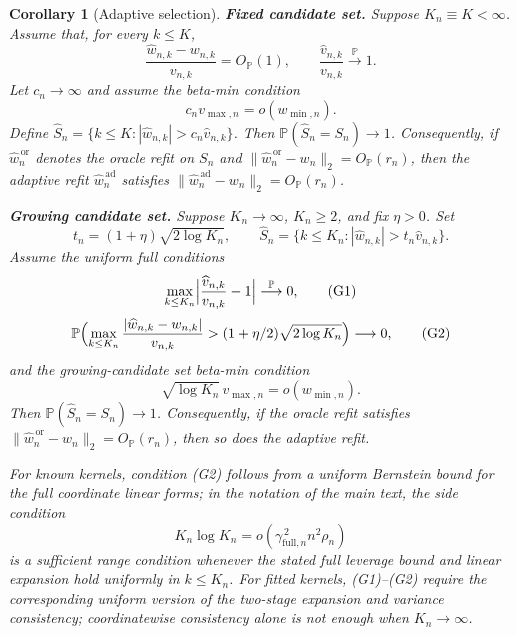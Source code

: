 \documentclass[12pt]{article}
\newtheorem{corollary}{Corollary}
\newcommand{\1}{\mathbf{1}}
\begin{document}
\begin{corollary}[Adaptive selection]
\smallskip
\noindent\textbf{Fixed candidate set.}
Suppose $K_n\equiv K<\infty$. Assume that, for every $k\le K$,
\[
        \frac{\widehat w_{n,k}-w_{n,k}}{v_{n,k}}=O_{\mathbb P}(1),
        \qquad
        \frac{\widehat v_{n,k}}{v_{n,k}}\stackrel{\mathbb P}{\longrightarrow}1 .
\]
Let $c_n\to\infty$ and assume the beta-min condition
\[
        c_n v_{\max,n}=o(w_{\min,n}).
        \tag{F}
\]
Define $\widehat S_n=\{k\le K: |\widehat w_{n,k}|>c_n\widehat v_{n,k}\}$. Then
$\mathbb P(\widehat S_n=S_n)\to 1$. Consequently, if $\widehat w_n^{\,\mathrm{or}}$ denotes the oracle
refit on $S_n$ and $\|\widehat w_n^{\,\mathrm{or}}-w_n\|_2=O_{\mathbb P}(r_n)$, then the adaptive refit
$\widehat w_n^{\,\mathrm{ad}}$ satisfies $\|\widehat w_n^{\,\mathrm{ad}}-w_n\|_2=O_{\mathbb P}(r_n)$.

\smallskip
\noindent\textbf{Growing candidate set.}
Suppose $K_n\to\infty$, $K_n\ge2$, and fix $\eta>0$. Set
\[
        t_n=(1+\eta)\sqrt{2\log K_n},
        \qquad
        \widehat S_n=\{k\le K_n:|\widehat w_{n,k}|>t_n\widehat v_{n,k}\}.
\]
Assume the uniform full conditions
\[
        \max_{k\le K_n}\Bigl|\frac{\widehat v_{n,k}}{v_{n,k}}-1\Bigr|
        \stackrel{\mathbb P}{\longrightarrow}0,
        \tag{G1}
\]
\[
        \mathbb P\Bigl(\max_{k\le K_n}\frac{|\widehat w_{n,k}-w_{n,k}|}{v_{n,k}}
        >(1+\eta/2)\sqrt{2\log K_n}\Bigr)\longrightarrow 0,
        \tag{G2}
\]
and the growing-candidate set beta-min condition
\[
        \sqrt{\log K_n}\,v_{\max,n}=o(w_{\min,n}).
        \tag{G3}
\]
Then $\mathbb P(\widehat S_n=S_n)\to 1$. Consequently, if the oracle refit satisfies
$\|\widehat w_n^{\,\mathrm{or}}-w_n\|_2=O_{\mathbb P}(r_n)$, then so does the adaptive refit.

For known kernels, condition \textup{(G2)} follows from a uniform Bernstein bound for the full
coordinate linear forms; in the notation of the main text, the side condition
\[
        K_n\log K_n=o(\gamma_{\mathrm{full},n}^{\,2}n^2\rho_n)
\]
is a sufficient range condition whenever the stated full leverage bound and linear expansion
hold uniformly in $k\le K_n$. For fitted kernels, \textup{(G1)}--\textup{(G2)} require the
corresponding uniform version of the two-stage expansion and variance consistency; coordinatewise
consistency alone is not enough when $K_n\to\infty$.
\end{corollary}
\end{document}
